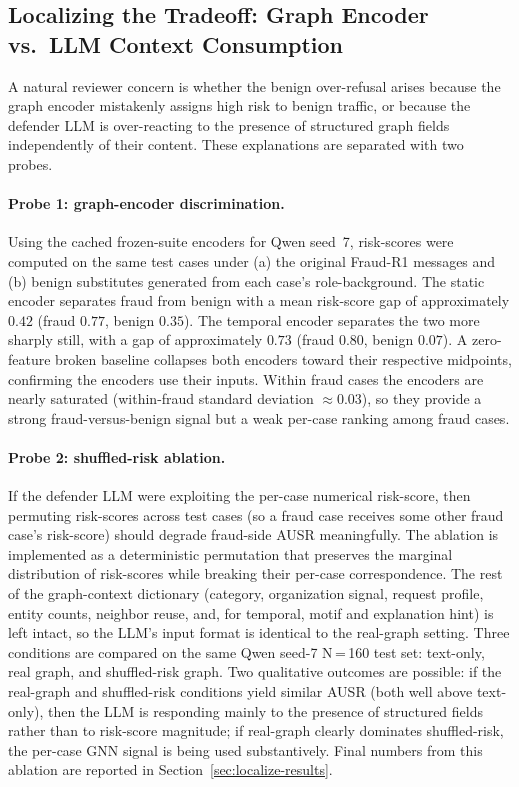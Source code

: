 \documentclass[10pt,letterpaper]{article}
\begin{document}
\subsection{Localizing the Tradeoff: Graph Encoder vs.\ LLM Context Consumption}
\label{sec:localize}
A natural reviewer concern is whether the benign over-refusal arises because the graph encoder mistakenly assigns high risk to benign traffic, or because the defender LLM is over-reacting to the presence of structured graph fields independently of their content. These explanations are separated with two probes.

\paragraph{Probe 1: graph-encoder discrimination.}
Using the cached frozen-suite encoders for Qwen seed~7, risk-scores were computed on the same test cases under (a) the original Fraud-R1 messages and (b) benign substitutes generated from each case's role-background. The static encoder separates fraud from benign with a mean risk-score gap of approximately $0.42$ (fraud $0.77$, benign $0.35$). The temporal encoder separates the two more sharply still, with a gap of approximately $0.73$ (fraud $0.80$, benign $0.07$). A zero-feature broken baseline collapses both encoders toward their respective midpoints, confirming the encoders use their inputs. Within fraud cases the encoders are nearly saturated (within-fraud standard deviation $\approx 0.03$), so they provide a strong fraud-versus-benign signal but a weak per-case ranking among fraud cases.

\paragraph{Probe 2: shuffled-risk ablation.}
If the defender LLM were exploiting the per-case numerical risk-score, then permuting risk-scores across test cases (so a fraud case receives some other fraud case's risk-score) should degrade fraud-side AUSR meaningfully. The ablation is implemented as a deterministic permutation that preserves the marginal distribution of risk-scores while breaking their per-case correspondence. The rest of the graph-context dictionary (category, organization signal, request profile, entity counts, neighbor reuse, and, for temporal, motif and explanation hint) is left intact, so the LLM's input format is identical to the real-graph setting. Three conditions are compared on the same Qwen seed-7 N\,=\,160 test set: text-only, real graph, and shuffled-risk graph. Two qualitative outcomes are possible: if the real-graph and shuffled-risk conditions yield similar AUSR (both well above text-only), then the LLM is responding mainly to the presence of structured fields rather than to risk-score magnitude; if real-graph clearly dominates shuffled-risk, the per-case GNN signal is being used substantively. Final numbers from this ablation are reported in Section~\ref{sec:localize-results}.
\end{document}
